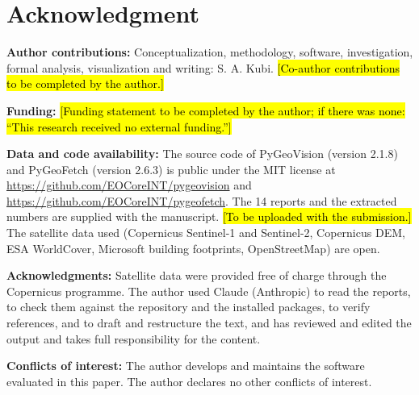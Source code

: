 \documentclass[conference]{IEEEtran}
\begin{document}
\section*{Acknowledgment}

\textbf{Author contributions:} Conceptualization, methodology, software, investigation, formal analysis, visualization and writing: S. A. Kubi. \hl{[Co-author contributions to be completed by the author.]}

\textbf{Funding:} \hl{[Funding statement to be completed by the author; if there was none: ``This research received no external funding.'']}

\textbf{Data and code availability:} The source code of PyGeoVision (version 2.1.8) and PyGeoFetch (version 2.6.3) is public under the MIT license at \url{https://github.com/EOCoreINT/pygeovision} and \url{https://github.com/EOCoreINT/pygeofetch}. The 14 reports and the extracted numbers are supplied with the manuscript. \hl{[To be uploaded with the submission.]} The satellite data used (Copernicus Sentinel-1 and Sentinel-2, Copernicus DEM, ESA WorldCover, Microsoft building footprints, OpenStreetMap) are open.

\textbf{Acknowledgments:} Satellite data were provided free of charge through the Copernicus programme. The author used Claude (Anthropic) to read the reports, to check them against the repository and the installed packages, to verify references, and to draft and restructure the text, and has reviewed and edited the output and takes full responsibility for the content.

\textbf{Conflicts of interest:} The author develops and maintains the software evaluated in this paper. The author declares no other conflicts of interest.



\end{document}
